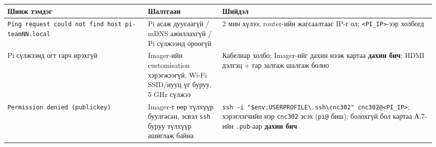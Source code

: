 \begingroup\scriptsize\begin{longtable}[]{@{}lll@{}}
\toprule
\begin{minipage}[b]{0.30\columnwidth}\raggedright
Шинж тэмдэг\strut
\end{minipage} & \begin{minipage}[b]{0.30\columnwidth}\raggedright
Шалтгаан\strut
\end{minipage} & \begin{minipage}[b]{0.30\columnwidth}\raggedright
Шийдэл\strut
\end{minipage}\tabularnewline
\midrule
\endhead
\begin{minipage}[t]{0.30\columnwidth}\raggedright
\texttt{Ping\ request\ could\ not\ find\ host\ pi-teamNN.\allowbreak{}local}\strut
\end{minipage} & \begin{minipage}[t]{0.30\columnwidth}\raggedright
Pi асаж дуусаагүй / mDNS ажиллахгүй / Pi сүлжээнд ороогүй\strut
\end{minipage} & \begin{minipage}[t]{0.30\columnwidth}\raggedright
2 мин хүлээ; router-ийн жагсаалтаас IP-г ол; \texttt{\textless{}PI\_\allowbreak{}IP\textgreater{}}-ээр холбогд\strut
\end{minipage}\tabularnewline
\begin{minipage}[t]{0.30\columnwidth}\raggedright
Pi сүлжээнд огт гарч ирэхгүй\strut
\end{minipage} & \begin{minipage}[t]{0.30\columnwidth}\raggedright
Imager-ийн customisation хэрэгжээгүй, Wi-Fi SSID/нууц үг буруу, 5 GHz сүлжээ\strut
\end{minipage} & \begin{minipage}[t]{0.30\columnwidth}\raggedright
Кабелиар холбо; Imager-ийг дахин нээж картаа \textbf{дахин бич}; HDMI дэлгэц + гар залгаж шалгаж болно\strut
\end{minipage}\tabularnewline
\begin{minipage}[t]{0.30\columnwidth}\raggedright
\texttt{Permission\ denied\ (publickey)}\strut
\end{minipage} & \begin{minipage}[t]{0.30\columnwidth}\raggedright
Imager-т өөр түлхүүр буулгасан, эсвэл \texttt{ssh} буруу түлхүүр ашиглаж байна\strut
\end{minipage} & \begin{minipage}[t]{0.30\columnwidth}\raggedright
\texttt{ssh\ -i\ "\$env:\allowbreak{}USERPROFILE\textbackslash{}\allowbreak{}.\allowbreak{}ssh\textbackslash{}\allowbreak{}cnc302"\ cnc302@\textless{}PI\_\allowbreak{}IP\textgreater{}}; хэрэглэгчийн нэр \texttt{cnc302} эсэх (\texttt{pi@} биш); болохгүй бол картаа А.7-ийн \texttt{.pub}-аар \textbf{дахин бич}\strut

\end{minipage}
\end{longtable}
